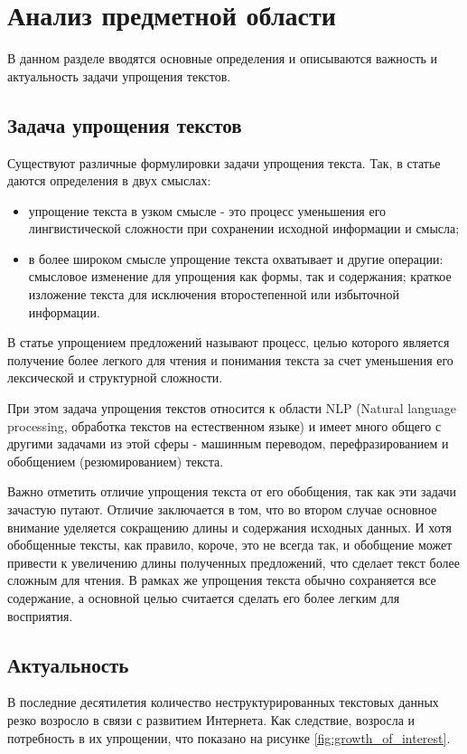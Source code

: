 \chapter{Анализ предметной области}

В данном разделе вводятся основные определения и описываются важность и актуальность задачи упрощения текстов.

\section{Задача упрощения текстов}


Существуют различные формулировки задачи упрощения текста. 
Так, в статье \cite{siddharthan_survey_2014} даются определения в двух смыслах:
\begin{itemize}
	\item упрощение текста в узком смысле - это процесс уменьшения его лингвистической сложности при сохранении исходной информации и смысла;
	\item в более широком смысле упрощение текста охватывает и другие операции: смысловое изменение для упрощения как формы, так и содержания; краткое изложение текста для исключения второстепенной или избыточной информации.
\end{itemize}

В статье \cite{martin_muss_2021} упрощением предложений называют процесс, целью которого является получение более легкого для чтения и понимания текста за счет уменьшения его лексической и структурной сложности.

При этом задача упрощения текстов относится к области NLP (Natural language processing, обработка текстов на естественном языке) и имеет много общего с другими задачами из этой сферы - машинным переводом, перефразированием и обобщением (резюмированием) текста\cite{zhu_monolingual_2010}. 

Важно отметить отличие упрощения текста от его обобщения, так как эти задачи зачастую путают. Отличие заключается в том, что во втором случае основное внимание уделяется сокращению длины и содержания исходных данных. И хотя обобщенные тексты, как правило, короче, это не всегда так, и обобщение может привести к увеличению длины полученных предложений\cite{shardlow_survey_2014}, что сделает текст более сложным для чтения. В рамках же упрощения текста обычно сохраняется все содержание, а основной целью считается сделать его более легким для восприятия.

\section{Актуальность}
В последние десятилетия количество неструктурированных текстовых данных резко возросло в связи с развитием Интернета. Как следствие, возросла и потребность в их упрощении, что показано на рисунке \ref{fig:growth_of_interest}. 


